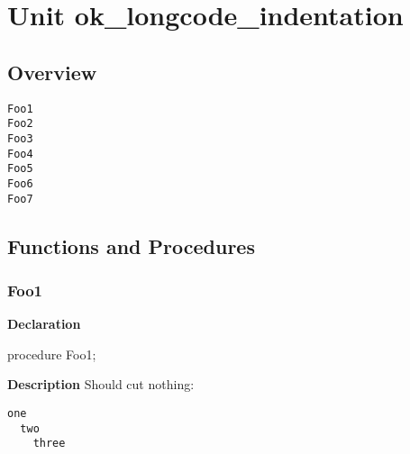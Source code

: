 \documentclass{report}
\newif\ifpdf
\begin{document}
\label{toc}\tableofcontents
\newpage
\newlength{\tmplength}
\chapter{Unit ok{\_}longcode{\_}indentation}
\label{ok_longcode_indentation}
\section{Overview}
\begin{description}
\item[\texttt{Foo1}]
\item[\texttt{Foo2}]
\item[\texttt{Foo3}]
\item[\texttt{Foo4}]
\item[\texttt{Foo5}]
\item[\texttt{Foo6}]
\item[\texttt{Foo7}]
\end{description}
\section{Functions and Procedures}
\ifpdf
\subsection*{\large{\textbf{Foo1}}\normalsize\hspace{1ex}\hrulefill}
\else
\subsection*{Foo1}
\fi
\label{ok_longcode_indentation-Foo1}
\begin{list}{}{
\setlength{\itemindent}{0cm}
\setlength{\listparindent}{0cm}
\setlength{\leftmargin}{\evensidemargin}
\addtolength{\leftmargin}{\tmplength}
\settowidth{\labelsep}{X}
\addtolength{\leftmargin}{\labelsep}
\setlength{\labelwidth}{\tmplength}
}
\item[\textbf{Declaration}\hfill]
\ifpdf
\begin{flushleft}
\fi
\begin{ttfamily}
procedure Foo1;\end{ttfamily}

\ifpdf
\end{flushleft}
\fi

\par
\item[\textbf{Description}]
Should cut nothing:

\texttt{one\\\nopagebreak[3]
~~two\\\nopagebreak[3]
~~~~three\\
}

\end{list}
\ifpdf
\end{document}
